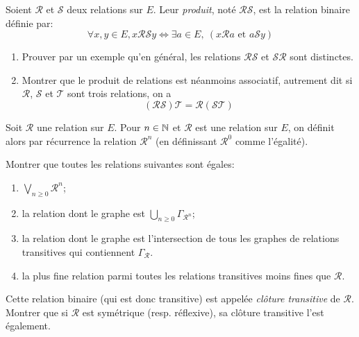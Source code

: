

\begin{exercice}
Soient $\mathcal R$ et $\mathcal S$ deux relations sur $E$. Leur \emph{produit}, noté $\mathcal R \mathcal S$, est la relation binaire définie par:
\[ \forall x,y\in E, x \mathcal R \mathcal S y 
\iff \exists a\in E, \: (x \mathcal R a \text{ et } a \mathcal S y)
\]
\begin{enumerate}
\item Prouver par un exemple qu'en général, les relations $\mathcal R \mathcal S$ et $\mathcal S \mathcal R$ sont distinctes.
\item Montrer que le produit de relations est néanmoins associatif, autrement dit si $\mathcal R$, $\mathcal S$ et $\mathcal T$ sont trois relations, on a 
\[ (\mathcal R \mathcal S) \mathcal T = \mathcal R (\mathcal S \mathcal T)\]
\end{enumerate}
\end{exercice}

\begin{exercice}
Soit $\mathcal R$ une relation sur $E$. Pour $n\in \mathbb{N}$ et $\mathcal R$ est une relation sur $E$, on définit alors par récurrence la relation $\mathcal R^n$ (en définissant $\mathcal R^0$ comme l'égalité).

Montrer que toutes les relations suivantes sont égales:
\begin{enumerate}
\item $\bigvee_{n\geq 0} \mathcal R^n$;
\item la relation dont le graphe est $\bigcup_{n\geq 0} \Gamma_{\mathcal R^{n}}$;
\item la relation dont le graphe est l'intersection de tous les graphes de relations transitives qui contiennent $\Gamma_{\mathcal R}$.
\item la plus fine relation  parmi toutes les relations transitives moins fines que $\mathcal R$.
\end{enumerate}

Cette relation binaire (qui est donc transitive) est appelée \emph{clôture transitive} de $\mathcal R$.
Montrer que si $\mathcal R$ est symétrique (resp. réflexive), sa clôture transitive l'est également.
\end{exercice}




